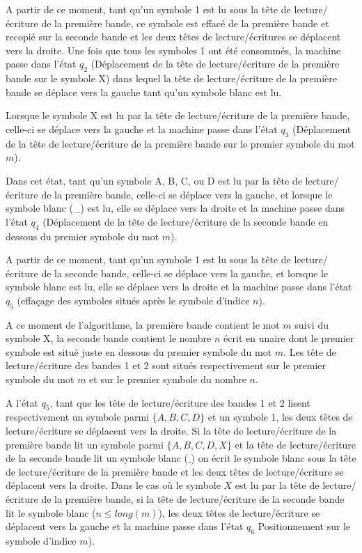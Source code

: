 A partir de ce moment, tant qu'un symbole 1 est lu sous la tête de lecture/écriture de la première bande, ce symbole est effacé de la première bande et recopié sur la seconde bande et les deux têtes de lecture/écritures se déplacent vers la droite.
Une fois que tous les symboles 1 ont été consommés, la machine passe dans l'état $q_2$ (Déplacement de la tête de lecture/écriture de la première bande sur le symbole X) dans lequel la tête de lecture/écriture de la première bande se déplace vers la gauche tant qu'un symbole blanc est lu.

Lorsque le symbole X est lu par la tête de lecture/écriture de la première bande, celle-ci se déplace vers la gauche et la machine passe dans l'état $q_3$ (Déplacement de la tête de lecture/écriture de la première bande sur le premier symbole du mot $m$).

Dans cet état, tant qu'un symbole A, B, C, ou D est lu par la tête de lecture/écriture de la première bande, celle-ci se déplace vers la gauche, et lorsque le symbole blanc (\_) est lu, elle se déplace vers la droite et la machine passe dans l'état $q_4$  (Déplacement de la tête de lecture/écriture de la seconde bande en dessous du premier symbole du mot $m$).

A partir de ce moment, tant qu'un symbole 1 est lu sous la tête de lecture/écriture de la seconde bande, celle-ci se déplace vers la gauche, et lorsque le symbole blanc est lu, elle se déplace vers la droite et la machine passe dans l'état $q_5$ (effaçage des symboles situés après le symbole d'indice $n$).

A ce moment de l'algorithme, la première bande contient le mot $m$ suivi du symbole X, la seconde bande contient le nombre $n$ écrit en unaire dont le premier symbole est situé juste en dessous du premier symbole du mot $m$. Les tête de lecture/écriture des bandes 1 et 2 sont situés respectivement sur le premier symbole du mot $m$ et sur le premier symbole du nombre $n$.

A l'état $q_5$, tant que les tête de lecture/écriture des bandes 1 et 2 lisent respectivement un symbole parmi $\{A, B, C, D\}$ et un symbole 1, les deux têtes de lecture/écriture se déplacent vers la droite. Si la tête de lecture/écriture de la première bande lit un symbole parmi $\{A, B, C, D, X\}$ et la tête de lecture/écriture de la seconde bande lit un symbole blanc ($\_$) on écrit le symbole blanc sous la tête de lecture/écriture de la première bande et les deux têtes de lecture/écriture se déplacent vers la droite. Dans le cas où le symbole $X$ est lu par la tête de lecture/écriture de la première bande, si la tête de lecture/écriture de la seconde bande lit le symbole blanc ($n \leq long(m)$), les deux têtes de lecture/écriture se déplacent vers la gauche et la machine passe dans l'état $q_6$ Positionnement sur le symbole d'indice $m$).

